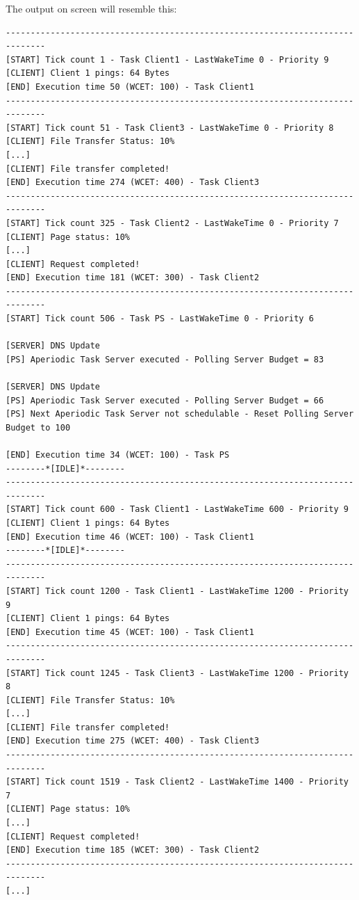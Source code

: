 \documentclass[10pt]{article}
\begin{document}
The output on screen will resemble this:
\begin{lstlisting}
------------------------------------------------------------------------------
[START] Tick count 1 - Task Client1 - LastWakeTime 0 - Priority 9 
[CLIENT] Client 1 pings: 64 Bytes
[END] Execution time 50 (WCET: 100) - Task Client1
------------------------------------------------------------------------------
[START] Tick count 51 - Task Client3 - LastWakeTime 0 - Priority 8 
[CLIENT] File Transfer Status: 10%
[...]
[CLIENT] File transfer completed!
[END] Execution time 274 (WCET: 400) - Task Client3
------------------------------------------------------------------------------
[START] Tick count 325 - Task Client2 - LastWakeTime 0 - Priority 7 
[CLIENT] Page status: 10%
[...]
[CLIENT] Request completed!
[END] Execution time 181 (WCET: 300) - Task Client2
------------------------------------------------------------------------------
[START] Tick count 506 - Task PS - LastWakeTime 0 - Priority 6 

[SERVER] DNS Update
[PS] Aperiodic Task Server executed - Polling Server Budget = 83

[SERVER] DNS Update
[PS] Aperiodic Task Server executed - Polling Server Budget = 66
[PS] Next Aperiodic Task Server not schedulable - Reset Polling Server Budget to 100

[END] Execution time 34 (WCET: 100) - Task PS
--------*[IDLE]*--------
------------------------------------------------------------------------------
[START] Tick count 600 - Task Client1 - LastWakeTime 600 - Priority 9 
[CLIENT] Client 1 pings: 64 Bytes
[END] Execution time 46 (WCET: 100) - Task Client1
--------*[IDLE]*--------
------------------------------------------------------------------------------
[START] Tick count 1200 - Task Client1 - LastWakeTime 1200 - Priority 9 
[CLIENT] Client 1 pings: 64 Bytes
[END] Execution time 45 (WCET: 100) - Task Client1
------------------------------------------------------------------------------
[START] Tick count 1245 - Task Client3 - LastWakeTime 1200 - Priority 8 
[CLIENT] File Transfer Status: 10%
[...]
[CLIENT] File transfer completed!
[END] Execution time 275 (WCET: 400) - Task Client3
------------------------------------------------------------------------------
[START] Tick count 1519 - Task Client2 - LastWakeTime 1400 - Priority 7 
[CLIENT] Page status: 10%
[...]
[CLIENT] Request completed!
[END] Execution time 185 (WCET: 300) - Task Client2
------------------------------------------------------------------------------
[...]
\end{lstlisting}
\newpage
\end{document}
